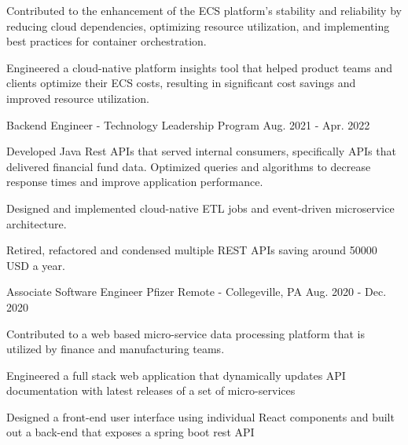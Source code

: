\begin{cventries}
{\begin{cvitems}
        \item {Contributed to the enhancement of the ECS platform's stability and reliability by reducing cloud dependencies, optimizing resource utilization, and implementing best practices for container orchestration.}
        \item {Engineered a cloud-native platform insights tool that helped product teams and clients optimize their ECS costs, resulting in significant cost savings and improved resource utilization.}
      \end{cvitems}
    }
  \cventry
    {Backend Engineer - Technology Leadership Program} %
    {} %
    {} %
    {Aug. 2021 - Apr. 2022} %
    {
      \begin{cvitems} %
        \item {Developed Java Rest APIs that served internal consumers, specifically APIs that delivered financial fund data. Optimized queries and algorithms to decrease response times and improve application performance.}
        \item {Designed and implemented cloud-native ETL jobs and event-driven microservice architecture.}
        \item {Retired, refactored and condensed multiple REST APIs saving around 50000 USD a year.}
      \end{cvitems}
    }


  \cventry
    {Associate Software Engineer} %
    {Pfizer} %
    {Remote - Collegeville, PA} %
    {Aug. 2020 - Dec. 2020} %
    {
      \begin{cvitems} %
        \item {Contributed to a web based micro-service data processing platform that is utilized by finance and manufacturing teams.}
        \item {Engineered a full stack web application that dynamically updates API documentation with latest releases of a set of micro-services}
        \item {Designed a front-end user interface using individual React components and built out a back-end that exposes a spring boot rest API}
      \end{cvitems}
    }

\end{cventries}
